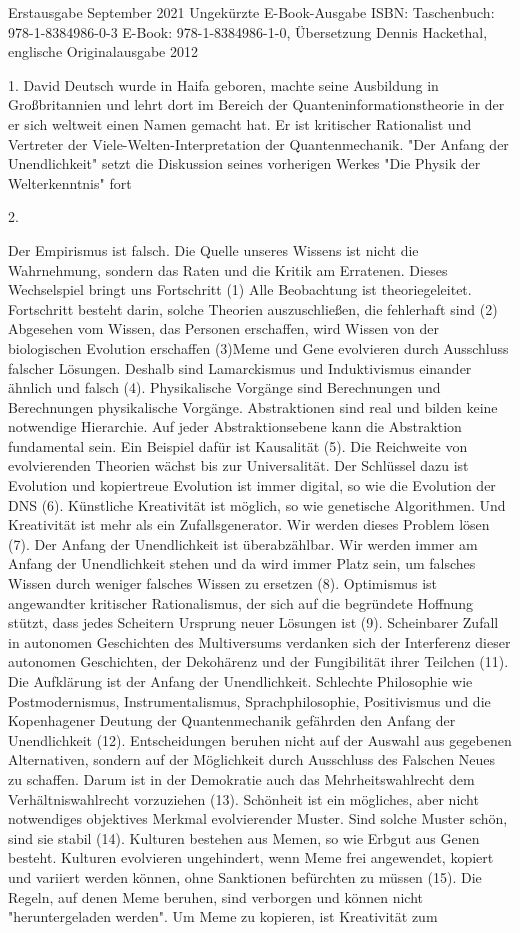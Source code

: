 \documentclass[
]{article}
\begin{document}
Erstausgabe September 2021 Ungekürzte E-Book-Ausgabe ISBN: Taschenbuch: 978-1-8384986-0-3 E-Book: 978-1-8384986-1-0, Übersetzung Dennis Hackethal, englische Originalausgabe 2012

1. David Deutsch wurde in Haifa geboren, machte seine Ausbildung in Großbritannien und lehrt dort im Bereich der Quanteninformationstheorie in der er sich weltweit einen Namen gemacht hat. Er ist kritischer Rationalist und Vertreter der Viele-Welten-Interpretation der Quantenmechanik. "Der Anfang der Unendlichkeit" setzt die Diskussion seines vorherigen Werkes "Die Physik der Welterkenntnis" fort

2.

Der Empirismus ist falsch. Die Quelle unseres Wissens ist nicht die Wahrnehmung, sondern das Raten und die Kritik am Erratenen. Dieses Wechselspiel bringt uns Fortschritt (1) Alle Beobachtung ist theoriegeleitet. Fortschritt besteht darin, solche Theorien auszuschließen, die fehlerhaft sind (2) Abgesehen vom Wissen, das Personen erschaffen, wird Wissen von der biologischen Evolution erschaffen (3)Meme und Gene evolvieren durch Ausschluss falscher Lösungen. Deshalb sind Lamarckismus und Induktivismus einander ähnlich und falsch (4). Physikalische Vorgänge sind Berechnungen und Berechnungen physikalische Vorgänge. Abstraktionen sind real und bilden keine notwendige Hierarchie. Auf jeder Abstraktionsebene kann die Abstraktion fundamental sein. Ein Beispiel dafür ist Kausalität (5). Die Reichweite von evolvierenden Theorien wächst bis zur Universalität. Der Schlüssel dazu ist Evolution und kopiertreue Evolution ist immer digital, so wie die Evolution der DNS (6). Künstliche Kreativität ist möglich, so wie genetische Algorithmen. Und Kreativität ist mehr als ein Zufallsgenerator. Wir werden dieses Problem lösen (7). Der Anfang der Unendlichkeit ist überabzählbar. Wir werden immer am Anfang der Unendlichkeit stehen und da wird immer Platz sein, um falsches Wissen durch weniger falsches Wissen zu ersetzen (8). Optimismus ist angewandter kritischer Rationalismus, der sich auf die begründete Hoffnung stützt, dass jedes Scheitern Ursprung neuer Lösungen ist (9). Scheinbarer Zufall in autonomen Geschichten des Multiversums verdanken sich der Interferenz dieser autonomen Geschichten, der Dekohärenz und der Fungibilität ihrer Teilchen (11). Die Aufklärung ist der Anfang der Unendlichkeit. Schlechte Philosophie wie Postmodernismus, Instrumentalismus, Sprachphilosophie, Positivismus und die Kopenhagener Deutung der Quantenmechanik gefährden den Anfang der Unendlichkeit (12). Entscheidungen beruhen nicht auf der Auswahl aus gegebenen Alternativen, sondern auf der Möglichkeit durch Ausschluss des Falschen Neues zu schaffen. Darum ist in der Demokratie auch das Mehrheitswahlrecht dem Verhältniswahlrecht vorzuziehen (13). Schönheit ist ein mögliches, aber nicht notwendiges objektives Merkmal evolvierender Muster. Sind solche Muster schön, sind sie stabil (14). Kulturen bestehen aus Memen, so wie Erbgut aus Genen besteht. Kulturen evolvieren ungehindert, wenn Meme frei angewendet, kopiert und variiert werden können, ohne Sanktionen befürchten zu müssen (15). Die Regeln, auf denen Meme beruhen, sind verborgen und können nicht "heruntergeladen werden". Um Meme zu kopieren, ist Kreativität zum 
\end{document}
